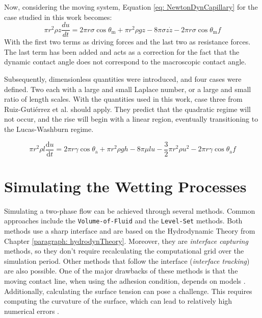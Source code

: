 Now, considering the moving system, Equation \ref{eq: NewtonDynCapillary} for the case studied in this work becomes:
\begin{equation}
    \pi r^{2}\rho z \frac{du}{dt}= 2\pi r\sigma \cos\theta_{\mathrm{m}}+\pi r^{2}\rho gz-8\pi \sigma z \dot{z} -2\pi r \sigma \cos \theta_{\mathrm{m}}f
\end{equation}
With the first two terms as driving forces and the last two as resistance forces. The last term has been added and acts as a correction for the fact that the dynamic contact angle does not correspond to the macroscopic contact angle.

Subsequently, dimensionless quantities were introduced, and four cases were defined. Two each with a large and small Laplace number, or a large and small ratio of length scales. With the quantities used in this work, case three from Ruiz-Gutiérrez et al. \cite{ruiz-gutierrez2022LongCrossoverDynamics} should apply. They predict that the quadratic regime will not occur, and the rise will begin with a linear region, eventually transitioning to the Lucas-Washburn regime.


\begin{equation}
    \pi r^2\rho l\frac{\mathrm{d}u}{\mathrm{d}t}=2\pi r\gamma\cos\theta_{\mathrm{a}}+\pi r^2\rho gh-8\pi\mu lu-\frac{3}{2}\pi r^2\rho u^2-2\pi r\gamma\cos\theta_{\mathrm{a}}f
\end{equation}


\section{Simulating the Wetting Processes}
Simulating a two-phase flow can be achieved through several methods. Common approaches include the \texttt{Volume-of-Fluid} and the \texttt{Level-Set} methods. Both methods use a sharp interface and are based on the Hydrodynamic Theory from Chapter \ref{paragraph: hydrodynTheory}. Moreover, they are \textit{interface capturing} methods, so they don't require recalculating the computational grid over the simulation period. Other methods that follow the interface (\textit{interface tracking}) are also possible. One of the major drawbacks of these methods is that the moving contact line, when using the adhesion condition, depends on models \cite{carlsonCapillarityDynamicWetting2012}. Additionally, calculating the surface tension can pose a challenge. This requires computing the curvature of the surface, which can lead to relatively high numerical errors \cite{jamshidi2019SuitabilityPhasefieldAlgebraic,hagg2019DirekteNumerischeSimulation}.

